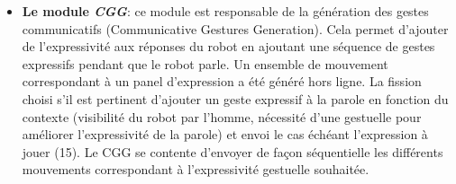 \documentclass[a4paper,11pt,twoside]{StyleThese}
\begin{document}
\begin{itemize}
\item \textbf{Le module \textit{CGG}}: ce module est responsable de la génération des gestes communicatifs (Communicative Gestures Generation). Cela permet d'ajouter de l'expressivité aux réponses du robot en ajoutant une séquence de gestes expressifs pendant que le robot parle. Un ensemble de mouvement correspondant à un panel d'expression a été généré hors ligne. La fission choisi s'il est pertinent d'ajouter un geste expressif à la parole en fonction du contexte (visibilité du robot par l'homme, nécessité d'une gestuelle pour améliorer l'expressivité de la parole) et envoi le cas échéant l'expression à jouer (15). Le CGG se contente d'envoyer de façon séquentielle les différents mouvements correspondant à l'expressivité gestuelle souhaitée.
\end{itemize}

\end{document}
